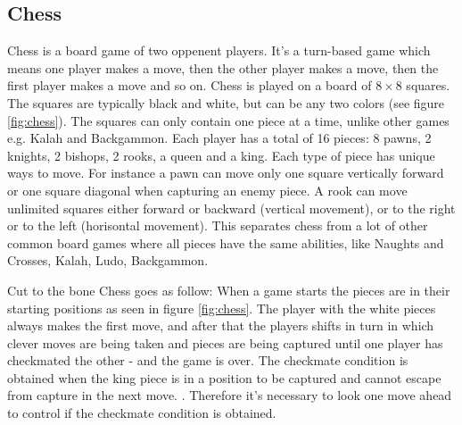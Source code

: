 \subsection{Chess}
Chess is a board game of two oppenent players. It's a turn-based game which means one player makes a move, 
then the other player makes a move, then the first player makes a move and so on. Chess is played on a board of $8 \times 8$ squares. The squares are typically black and white, but can be any two colors (see figure \ref{fig:chess}). The squares can only contain one piece at a time, unlike other games e.g. Kalah and Backgammon. Each player has a total of 16 pieces: 8 pawns, 2 knights, 2 bishops, 2 rooks, a queen and a king. Each type of piece has unique ways to move. For instance a pawn can move only one square vertically forward or one square diagonal when capturing an enemy piece. A rook can move unlimited squares either forward or backward (vertical movement), or to the right or to the left (horisontal movement). This separates chess from a lot of other common board games where all pieces have the same abilities, like Naughts and Crosses, Kalah, Ludo, Backgammon.  

Cut to the bone Chess goes as follow: When a game starts the pieces are in their starting positions as seen in figure \ref{fig:chess}. The player with the white pieces always makes the first move, and after that the players shifts in turn in which clever moves are being taken and pieces are being captured until one player has checkmated the other - and the game is over. The checkmate condition is obtained when the king piece is in a position to be captured and cannot escape from capture in the next move. \cite{chessrules}. Therefore it's necessary to look one move ahead to control if the checkmate condition is obtained.

